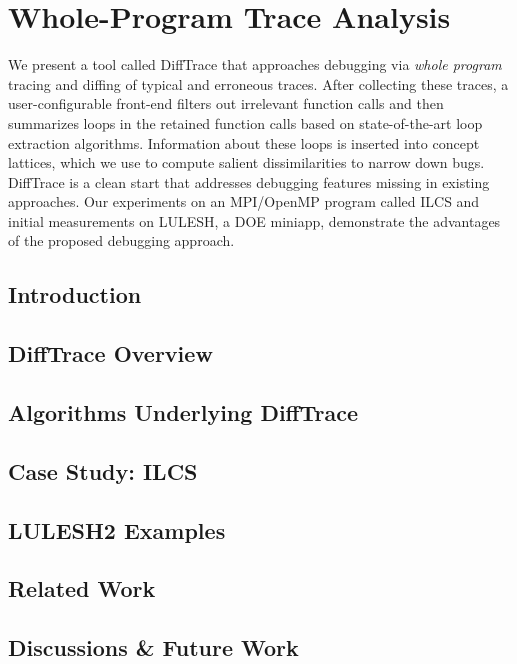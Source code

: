 
\chapter{Whole-Program Trace Analysis}
We present a tool called
DiffTrace that approaches debugging via {\em whole program} tracing and
diffing of typical and erroneous traces.
%
After collecting these traces,
a user-configurable front-end filters out irrelevant function calls
and then summarizes loops in the retained function
calls based on state-of-the-art loop extraction algorithms.
%
Information about these loops is inserted
into concept lattices, which we use to
compute salient dissimilarities to narrow down bugs.
%
DiffTrace is a clean start that addresses
debugging features missing in existing approaches.
%
Our experiments on an MPI/OpenMP program called
ILCS and initial measurements on LULESH, a DOE miniapp,
demonstrate the advantages of the proposed debugging approach.

\section{Introduction}
\label{sec:ch3_intro}

 

\section{DiffTrace Overview}
\label{sec:ch3_overview}


\section{Algorithms Underlying DiffTrace}
\label{sec:ch3_algo}


\section{Case Study: ILCS}
\label{sec:ch3_ilcs-case-study}

%

\section{LULESH2 Examples}
\label{sec:ch3_lulesh}


\section{Related Work}
\label{sec:ch3_related}


\section{Discussions \& Future Work}
\label{sec:ch3_discussion}

